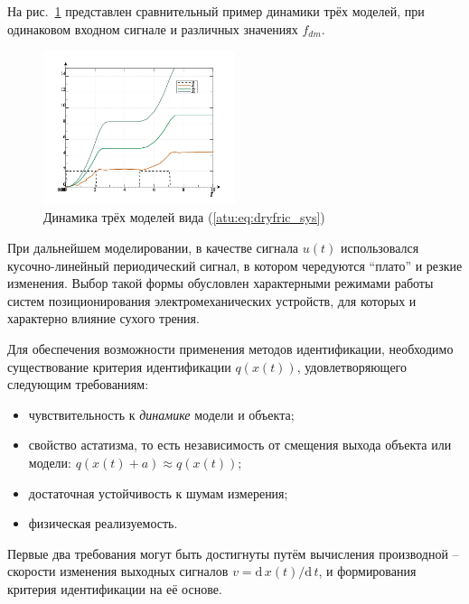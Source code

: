 На рис.~\ref{atu:f:fric_outs} представлен сравнительный пример динамики трёх
моделей, при одинаковом входном сигнале
и различных значениях $f_{dm}$.

\begin{figure}[htb!]
  \centerline{
    \includegraphics[width=0.5\textwidth]{p/cha/fric/fric_outs.png}
  }
  \caption{Динамика трёх моделей вида (\ref{atu:eq:dryfric_sys})}
  \label{atu:f:fric_outs}
\end{figure}

При дальнейшем моделировании, в качестве сигнала $u(t)$ использовался кусочно-линейный периодический сигнал,
в котором чередуются ``плато'' и резкие изменения. Выбор такой формы обусловлен
характерными режимами работы систем позиционирования электромеханических
устройств, для которых и характерно влияние сухого трения.

Для обеспечения возможности применения методов идентификации,
необходимо существование критерия идентификации
\( q(x(t)) \),
удовлетворяющего следующим требованиям:

\begin{itemize}

\item
чувствительность к \textit{динамике} модели и объекта;

\item
свойство астатизма, то есть
независимость
от смещения выхода объекта или модели:
\( q(x(t)+a ) \approx q( x(t) ) \);

\item
достаточная устойчивость к шумам измерения;

\item
физическая реализуемость.

\end{itemize}

Первые два требования
могут быть достигнуты путём вычисления производной --
скорости изменения выходных сигналов
\(v = \mathrm{d}\,x(t)/ \mathrm{d}\,t \),
и формирования критерия идентификации на её основе.

